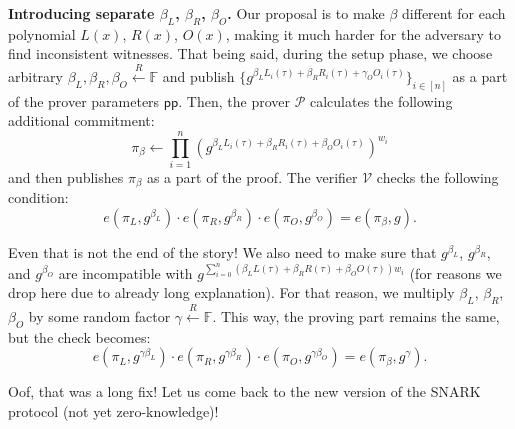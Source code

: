 \documentclass[../lecture-notes.tex]{subfiles}
\begin{document}
\textbf{Introducing separate $\beta_L$, $\beta_R$, $\beta_O$.} Our proposal is to make $\beta$ different for each polynomial $L(x)$, $R(x)$, $O(x)$, making it much harder for the adversary to find inconsistent witnesses. That being said, during the setup phase, we choose arbitrary $\beta_L,\beta_R,\beta_O \xleftarrow{R} \mathbb{F}$ and publish $\{g^{\beta_LL_i(\tau)+\beta_RR_i(\tau)+\gamma_OO_i(\tau)}\}_{i \in [n]}$ as a part of the prover parameters $\mathsf{pp}$. Then, the prover $\mathcal{P}$ calculates the following additional commitment:
\begin{equation*}
    \pi_{\beta} \gets \prod_{i=1}^n (g^{\beta_LL_i(\tau) + \beta_RR_i(\tau) + \beta_OO_i(\tau)})^{w_i}
\end{equation*}
and then publishes $\pi_{\beta}$ as a part of the proof. The verifier $\mathcal{V}$ checks the following condition:
\begin{equation*}
    e(\pi_L, g^{\beta_L}) \cdot e(\pi_R, g^{\beta_R}) \cdot e(\pi_O, g^{\beta_O}) = e(\pi_{\beta}, g).
\end{equation*}

Even that is not the end of the story! We also need to make sure that $g^{\beta_L}$, $g^{\beta_R}$, and $g^{\beta_O}$ are incompatible with $g^{\sum_{i=0}^n (\beta_LL(\tau) + \beta_RR(\tau) + \beta_OO(\tau))w_i}$ (for reasons we drop here due to already long explanation). For that reason, we multiply $\beta_L$, $\beta_R$, $\beta_O$ by some random factor $\gamma \xleftarrow{R} \mathbb{F}$. This way, the proving part remains the same, but the check becomes:
\begin{equation*}
    e(\pi_L, g^{\gamma\beta_L}) \cdot e(\pi_R, g^{\gamma\beta_R}) \cdot e(\pi_O, g^{\gamma\beta_O}) = e(\pi_{\beta}, g^{\gamma}).
\end{equation*}

Oof, that was a long fix! Let us come back to the new version of the SNARK protocol (not yet zero-knowledge)!
\end{document}
